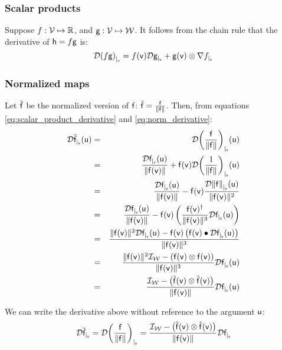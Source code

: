 
\subsubsection{Scalar products}
\label{sec:Derivatives-of-scalar-products}

Suppose
$f:\Vspace \mapsto \Reals$, and
$\g:\Vspace \mapsto \Wspace$.
It follows from the chain rule that the derivative of $\h = f\g$ is:
\begin{equation}
\label{eq:scalar_product_derivative}
\Db{(f\g)}{\v} =  f(\v) \Db{\g}{\v} + \g(\v) \otimes \Gb{f}{\v}
\end{equation}



\subsubsection{Normalized maps}
\label{sec:Normalized-maps}

Let $\tilde{\f}$ be the normalized version of $\f$:
$\tilde{\f}  =  \frac{\f}{\| \f \|}$.
Then, from equations \ref{eq:scalar_product_derivative}
and \ref{eq:norm_derivative}:
\begin{eqnarray}
\Dc{\tilde{\f}}{\v}{\u}
& = &
\Dc{\left( \frac{\f}{\| \f \|}\right)}{\v}{\u}
\\
& = &
\frac{\Dc{\f}{\v}{\u}}{ \| \f(\v) \|}
 +
\f(\v)  \Dc{ \left( \frac{1}{\| \f \|} \right) }{\v}{\u} \nonumber \\
& = &
\frac{\Dc{\f}{\v}{\u}}
{\| \f(\v) \|}
 -
\f(\v)
\frac{\Dc{\| \f \|}{\v}{\u}}
{\|\f(\v)\|^2} \nonumber \\
& = &
\frac{\Dc{\f}{\v}{\u}}{ \| \f(\v) \| }
 -
\f(\v) \left( \frac{\f(\v)^\dagger}{\| \f(\v) \|^3}  \Dc{\f}{\v}{\u} \right) \nonumber \\
& = &
\frac{
\| \f(\v) \|^2 \Dc{\f}{\v}{\u}
 -
\f(\v)\left( \f(\v) \bullet \Dc{\f}{\v}{\u} \right)
}
{\| \f(\v) \|^3}  \nonumber \\
& = &
\frac{\| \f(\v) \|^2 \Identity_{\Wspace} - \left( \f(\v) \otimes \f(\v) \right)  }
{ \| \f(\v) \|^3 }
\Dc{\f}{\v}{\u} \nonumber \\
& = &
\frac{\Identity_{\Wspace} - \left( \tilde{\f}(\v) \otimes \tilde{\f}(\v) \right)  }
{\| \f(\v) \|}
\Dc{\f}{\v}{\u} \nonumber
\end{eqnarray}


We can write the derivative above without reference to the argument $\u$:
\begin{equation}
\label{eq:normalized_function_derivative}
\Db{\tilde{\f}}{\v}
 =
\Db{\left( \frac{\f}{\| \f \|} \right)}{\v}
 =
\frac{\Identity_{\Wspace} - \left( \tilde{\f}(\v) \otimes \tilde{\f}(\v) \right) }
{ \| \f(\v) \| }
\Db{\f}{\v}
\end{equation}

